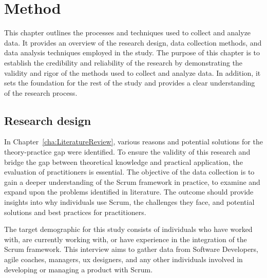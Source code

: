 \chapter{Method}\label{cha:Method}
This chapter outlines the processes and techniques used to collect and analyze data. It provides an overview of the research design, data collection \glspl{method}, and data analysis techniques employed in the study. The purpose of this chapter is to establish the credibility and reliability of the research by demonstrating the validity and rigor of the \glspl{method} used to collect and analyze data. In addition, it sets the foundation for the rest of the study and provides a clear understanding of the research process.

\section{Research design}\label{sec:Researchdesign}
In Chapter~\ref{cha:LiteratureReview}, various reasons and potential solutions for the theory-practice gap were identified. To ensure the validity of this research and bridge the gap between theoretical knowledge and practical application, the evaluation of practitioners is essential. The objective of the data collection is to gain a deeper understanding of the Scrum \gls{framework} in practice, to examine and expand upon the problems identified in literature. The outcome should provide insights into why individuals use Scrum, the challenges they face, and potential solutions and best practices for practitioners.

The target demographic for this study consists of individuals who have worked with, are currently working with, or have experience in the integration of the Scrum \gls{framework}. This interview aims to gather data from Software Developers, \gls{agile} coaches, managers, \ac{ux} designers, and any other individuals involved in developing or managing a product with Scrum.

